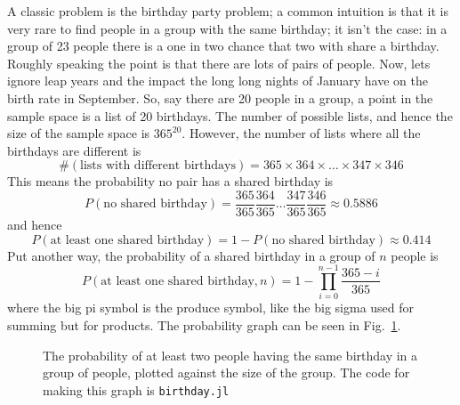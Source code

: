 \documentclass[11pt,a4paper]{scrartcl}
\begin{document}
A classic problem is the birthday party problem; a common intuition is
that it is very rare to find people in a group with the same birthday;
it isn't the case: in a group of 23 people there is a one in two
chance that two with share a birthday. Roughly speaking the point is that
there are lots of pairs of people. Now, lets ignore leap years and the
impact the long long nights of January have on the birth rate in
September. So, say there are 20 people in a
group, a point in the sample space is a list of 20 birthdays. The
number of possible lists, and hence the size of the sample space is
$365^{20}$. However, the number of lists where all the birthdays are
different is
\begin{equation}
\#(\mbox{lists with different birthdays})=365\times 364 \times \ldots \times 347 \times 346
\end{equation}
This means the probability no pair has a shared birthday is
\begin{equation}
P(\mbox{no shared birthday})=\frac{365}{365}\frac{364}{365}\ldots\frac{347}{365}\frac{346}{365}\approx 0.5886
\end{equation}
and hence
\begin{equation}
P(\mbox{at least one shared birthday})=1-P(\mbox{no shared birthday})\approx 0.414
\end{equation}
Put another way, the probability of a shared birthday in a group of $n$ people is
\begin{equation}
P(\mbox{at least one shared birthday},n)=1-\prod_{i=0}^{n-1}\frac{365-i}{365}
\end{equation}
where the big pi symbol is the produce symbol, like the big sigma used
for summing but for products. The probability graph can be seen in Fig.~\ref{fig_birthday}.


\begin{figure}[thb]
\begin{center}

\end{center}
\caption{The probability of at least two people having the same birthday in a group of people, plotted against the size of the group. The code for making this graph is \texttt{birthday.jl}\label{fig_birthday}}
\end{figure}
\end{document}

